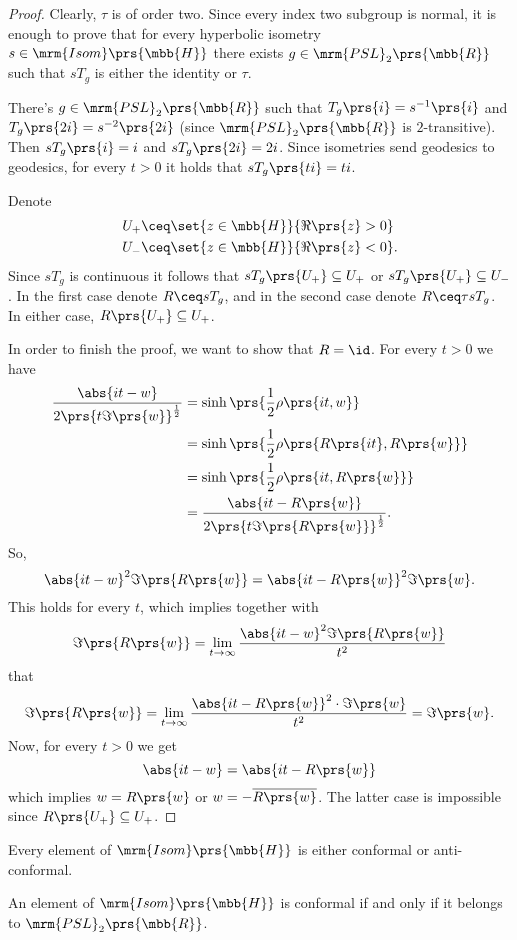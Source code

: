 \documentclass[10pt, twoside]{book}
\begin{document}
\begin{proof}
Clearly, $\tau$ is of order two. Since every index two subgroup is normal, it is enough to prove that for every hyperbolic isometry $s \in \mrm{Isom}\prs{\mbb{H}}$ there exists $g \in \mrm{PSL}_2\prs{\mbb{R}}$ such that $sT_g$ is either the identity or $\tau$.

There's $g \in \mrm{PSL}_2\prs{\mbb{R}}$ such that $T_g\prs{i} = s^{-1}\prs{i}$ and $T_g\prs{2i} = s^{-2}\prs{2i}$ (since $\mrm{PSL}_2\prs{\mbb{R}}$ is $2$-transitive). Then
$s T_g\prs{i} = i$ and $sT_g\prs{2i} = 2i$. Since isometries send geodesics to geodesics, for every $t>0$ it holds that $s T_g\prs{t i} = ti$.

Denote
\begin{align*}
U_+ &\ceq \set{z \in \mbb{H}}{\Re\prs{z} > 0} \\
U_{-} &\ceq \set{z \in \mbb{H}}{\Re\prs{z} < 0}\text{.}
\end{align*}
Since $s T_g$ is continuous it follows that $s T_g \prs{U_+} \subseteq U_+$ or $s T_g\prs{U_+} \subseteq U_-$.
In the first case denote $R \ceq s T_g$, and in the second case denote $R \ceq \tau s T_g$. In either case, $R\prs{U_+} \subseteq U_+$.

In order to finish the proof, we want to show that $R = \id$. For every $t > 0 $ we have
\begin{align*}
\frac{\abs{it - w}}{2 \prs{t \Im\prs{w}}^{\frac{1}{2}}} &= \sinh\prs{\frac{1}{2} \rho\prs{it, w}}
\\&=
\sinh\prs{\frac{1}{2} \rho\prs{R\prs{it}, R\prs{w}}}
\\&=
\sinh\prs{\frac{1}{2} \rho\prs{it, R\prs{w}}}
\\&=
\frac{\abs{it - R\prs{w}}}{2 \prs{t \Im\prs{R\prs{w}}}^{\frac{1}{2}}} \text{.}
\end{align*}
So,
\[\abs{it - w}^2 \Im\prs{R\prs{w}} = \abs{it - R\prs{w}}^2 \Im\prs{w} \text{.}\]
This holds for every $t$, which implies together with
\[\Im\prs{R\prs{w}} = \lim_{t \to \infty} \frac{\abs{it - w}^2 \Im\prs{R\prs{w}}}{t^2}\]
that
\[\Im\prs{R\prs{w}} = \lim_{t \to \infty} \frac{\abs{it - R\prs{w}}^2 \cdot \Im\prs{w}}{t^2} = \Im\prs{w} \text{.}\]
Now, for every $t > 0$ we get
\[\abs{it - w} = \abs{it - R\prs{w}}\]
which implies
$w = R\prs{w}$
or
$w = - \overline{R\prs{w}}$.
The latter case is impossible since $R\prs{U_+} \subseteq  U_+$.
\end{proof}

\begin{corollary}
Every element of $\mrm{Isom}\prs{\mbb{H}}$ is either conformal or anti-conformal.

An element of $\mrm{Isom}\prs{\mbb{H}}$ is conformal if and only if it belongs to $\mrm{PSL}_2\prs{\mbb{R}}$.
\end{corollary}
\end{document}
